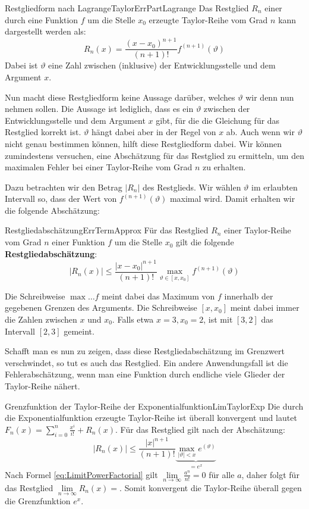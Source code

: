 \begin{statement}{Restgliedform nach Lagrange}{TaylorErrPartLagrange}
    Das Restglied $R_n$ einer durch eine Funktion $f$ um die Stelle $x_0$ erzeugte Taylor-Reihe vom Grad $n$ kann dargestellt werden als:
    $$
        R_n(x) = \frac{(x-x_0)^{n+1}}{(n+1)!} f^{(n+1)}(\vartheta)
    $$
    Dabei ist $\vartheta$ eine Zahl zwischen (inklusive) der Entwicklungsstelle und dem Argument $x$.
\end{statement}

Nun macht diese Restgliedform keine Aussage darüber, welches $\vartheta$ wir denn nun nehmen sollen. Die Aussage ist lediglich, dass es ein $\vartheta$ zwischen der Entwicklungsstelle und dem Argument $x$ gibt, für die die Gleichung für das Restglied korrekt ist. $\vartheta$ hängt dabei aber in der Regel von $x$ ab. Auch wenn wir $\vartheta$ nicht genau bestimmen können, hilft diese Restgliedform dabei. Wir können zumindestens versuchen, eine Abschätzung für das Restglied zu ermitteln, um den maximalen Fehler bei einer Taylor-Reihe vom Grad $n$ zu erhalten.

Dazu betrachten wir den Betrag $|R_n|$ des Restglieds. Wir wählen $\vartheta$ im erlaubten Intervall so, dass der Wert von $f^{(n+1)}(\vartheta)$ maximal wird. Damit erhalten wir die folgende Abschätzung:

\begin{statement}{Restgliedabschätzung}{ErrTermApprox}
    Für das Restglied $R_n$ einer Taylor-Reihe vom Grad $n$ einer Funktion $f$ um die Stelle $x_0$ gilt die folgende \textbf{Restgliedabschätzung}:
    $$
        |R_n(x)| \le \frac{|x-x_0|^{n+1}}{(n+1)!} \max\limits_{\vartheta \in [x,x_0]} f^{(n+1)}(\vartheta)
    $$
\end{statement}

Die Schreibweise $\max\limits{\dots} f$ meint dabei das Maximum von $f$ innerhalb der gegebenen Grenzen des Arguments. Die Schreibweise $[x, x_0]$ meint dabei immer die Zahlen zwischen $x$ und $x_0$. Falls etwa $x=3, x_0=2$, ist mit $[3,2]$ das Intervall $[2,3]$ gemeint.

Schafft man es nun zu zeigen, dass diese Restgliedabschätzung im Grenzwert verschwindet, so tut es auch das Restglied. Ein andere Anwendungsfall ist die Fehlerabschätzung, wenn man eine Funktion durch endliche viele Glieder der Taylor-Reihe nähert.

\begin{example}{Grenzfunktion der Taylor-Reihe der Exponentialfunktion}{LimTaylorExp}
    Die durch die Exponentialfunktion erzeugte Taylor-Reihe ist überall konvergent und lautet $F_n(x) = \sum\limits_{i=0}^n \frac{x^i}{i!} + R_n(x)$. Für das Restglied gilt nach der Abschätzung:
    $$
        |R_n(x)| \le  \frac{|x|^{n+1}}{(n+1)!} \underbrace{\max\limits_{|\vartheta| < x} e^(\vartheta)}_{=e^x}
    $$
    Nach Formel \ref{eq:LimitPowerFactorial} gilt $\lim\limits_{n\to\infty} \frac{a^n}{n!} = 0$ für alle $a$, daher folgt für das Restglied $\lim\limits_{n\to\infty} R_n(x) = $. Somit konvergent die Taylor-Reihe überall gegen die Grenzfunktion $e^x$.
\end{example}

